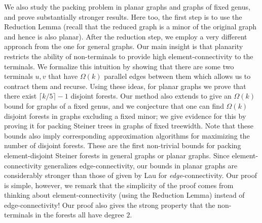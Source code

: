 \documentclass[11pt]{article}
\def\ceil#1{\lceil {#1} \rceil}
\begin{document}
We also study the packing problem in planar graphs and graphs of fixed
genus, and prove substantially stronger results. Here too, the first
step is to use the Reduction Lemma (recall that the reduced graph is a
minor of the original graph and hence is also planar). After the
reduction step, we employ a very different approach from the one for
general graphs.  Our main insight is that planarity restricts the
ability of non-terminals to provide high element-connectivity to the
terminals. We formalize this intuition by showing that there are some
two terminals $u,v$ that have $\Omega(k)$ parallel edges between them
which allows us to contract them and recurse. Using these ideas, for
planar graphs we prove that there exist $\ceil{k/5} -1$ disjoint
forests. Our method also extends to give an $\Omega(k)$ bound for
graphs of a fixed genus, and we conjecture that one can find
$\Omega(k)$ disjoint forests in graphs excluding a fixed minor; we
give evidence for this by proving it for packing Steiner trees in
graphs of fixed treewidth. Note that these bounds also imply
corresponding approximation algorithms for maximizing the number of
disjoint forests. These are the first non-trivial bounds for packing
element-disjoint Steiner forests in general graphs or planar
graphs. Since element-connectivity generalizes edge-connectivity, our
bounds in planar graphs are considerably stronger than those of given
by Lau \cite{Lau1,Lau2} for {\em edge}-connectivity. Our proof is
simple, however, we remark that the simplicity of the proof comes from
thinking about element-connectivity (using the Reduction Lemma)
instead of edge-connectivity! Our proof also gives the strong property
that the non-terminals in the forests all have degree $2$.
\end{document}
